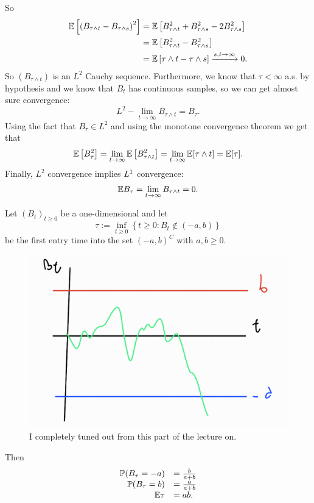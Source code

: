 \documentclass[12pt]{report}
\begin{document}
\begin{fancyproof}
\begin{enumerate}
			So
			\begin{align*}
				\mathbb{E}\left[\left(B_{\tau\wedge t}-B_{\tau\wedge s}\right)^{2}\right]&=\mathbb{E}\left[B^{2}_{\tau\wedge t}+B^{2}_{\tau\wedge s}-2B^{2}_{\tau\wedge s}\right]\\
				&=\mathbb{E}\left[B^{2}_{\tau\wedge t}-B^{2}_{\tau\wedge s}\right]\\
				&=\mathbb{E}\left[\tau\wedge t-\tau\wedge s\right]\xrightarrow[]{s,t\to\infty}0.
			\end{align*}
			So $\left(B_{\tau\wedge t}\right)$ is an $L^{2}$ Cauchy sequence. Furthermore, we know that $\tau<\infty$ a.s. by hypothesis and we know that $B_{t}$ has continuous samples, so we can get almost sure convergence:
			\begin{equation*}
				L^{2}-\lim_{t\to\infty}B_{\tau\wedge t}=B_{\tau}.
			\end{equation*}
			Using the fact that $B_{\tau}\in L^{2}$ and using the monotone convergence theorem we get that 
			\begin{equation*}
				\mathbb{E}\left[B^{2}_{\tau}\right]=\lim_{t\to\infty}\mathbb{E}\left[B^{2}_{\tau\wedge t}\right]=\lim_{t\to\infty}\mathbb{E}[\tau\wedge t]=\mathbb{E}[\tau].
			\end{equation*}
			Finally, $L^{2}$ convergence implies $L^{1}$ convergence:
			\begin{equation*}
				\mathbb{E} B_{\tau}=\lim_{t\to\infty}B_{\tau\wedge t}=0.
			\end{equation*}
		\end{enumerate}
	\end{fancyproof}
	\begin{corollary}
		Let ${(B_{t})}_{t\geq0}$ be a one-dimensional \bwm{} and let 
		\begin{equation*}
			\tau:=\inf_{t\geq 0}\left\{t\geq0:B_{t}\notin(-a,b)\right\}
		\end{equation*}
		be the first entry time into the set $(-a,b)^{C}$ with $a,b\geq 0$.
		\begin{figure}[H]
			\centering
			\includegraphics[width=0.5\linewidth]{img/screenshot019}
			\caption{I completely tuned out from this part of the lecture on.}
			\label{fig:screenshot019}
		\end{figure}
		Then
		\begin{equation*}
			\begin{array}{rl}
				\mathbb{P}(B_{\tau}=-a)&=\frac{b}{a+b}\\
				\mathbb{P}(B_{\tau}=b)&=\frac{a}{a+b}\\
				\mathbb{E}\tau&=ab.
			\end{array}
		\end{equation*}
	\end{corollary}
\end{document}

